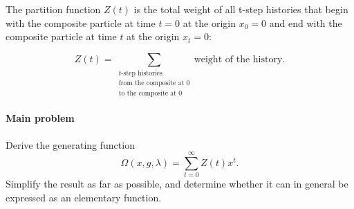 The partition function $Z(t)$ is the total weight of all t-step histories that begin with the composite particle at time $t=0$ at the origin $x_0 = 0$  and end with the composite particle at time $t$ at the origin $x_t = 0$:

$$
Z(t)=
\sum_{\substack{\text{\(t\)-step histories}\\
\text{from the composite at \(0\)}\\
\text{to the composite at \(0\)}}}
\text{weight of the history}.
$$



\paragraph*{Main problem}

Derive the generating function
\begin{equation}
\Omega(x, g, \lambda) = \sum_{t = 0}^{\infty} Z(t) x^t.
\end{equation}
Simplify the result as far as possible, and determine whether it can in general be expressed as an elementary function.





